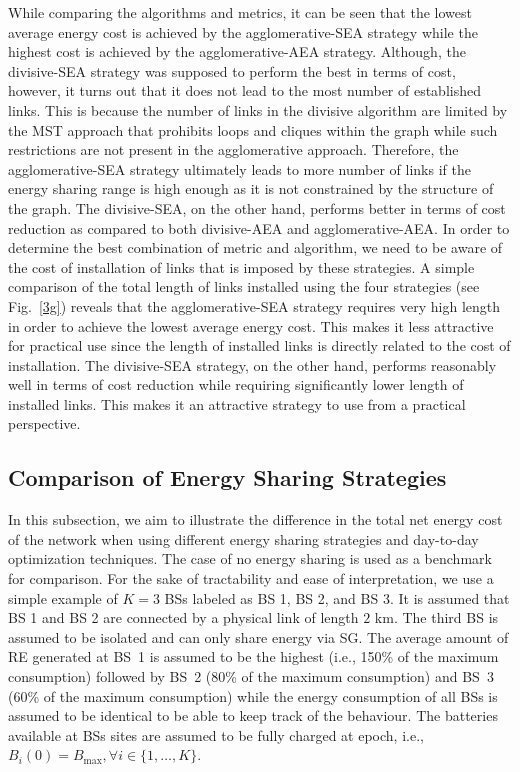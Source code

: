 \documentclass[10pt, letter,twocolumn]{IEEEtran}
\begin{document}
While comparing the algorithms and metrics, it can be seen that the lowest average energy cost is achieved by the agglomerative-SEA strategy while the highest cost is achieved by the agglomerative-AEA strategy. Although, the divisive-SEA strategy was supposed to perform the best in terms of cost, however, it turns out that it does not lead to the most number of established links. This is because the number of links in the divisive algorithm are limited by the MST approach that prohibits loops and cliques within the graph while such restrictions are not present in the agglomerative approach. Therefore, the agglomerative-SEA strategy ultimately leads to more number of links if the energy sharing range is high enough as it is not constrained by the structure of the graph. The divisive-SEA, on the other hand, performs better in terms of cost reduction as compared to both divisive-AEA and agglomerative-AEA. In order to determine the best combination of metric and algorithm, we need to be aware of the cost of installation of links that is imposed by these strategies. A simple comparison of the total length of links installed using the four strategies (see Fig.~\ref{3g}) reveals that the agglomerative-SEA strategy requires very high length in order to achieve the lowest average energy cost. This makes it less attractive for practical use since the length of installed links is directly related to the cost of installation. The divisive-SEA strategy, on the other hand, performs reasonably well in terms of cost reduction while requiring significantly lower length of installed links. This makes it an attractive strategy to use from a practical perspective.

\vspace{-0.0cm}
\subsection{Comparison of Energy Sharing Strategies} \label{cost_comparison}\vspace{-0.0cm}
In this subsection, we aim to illustrate the difference in the total net energy cost of the network when using different energy sharing strategies and day-to-day optimization techniques. The case of no energy sharing is used as a benchmark for comparison. For the sake of tractability and ease of interpretation, we use a simple example of $K = 3$ BSs labeled as BS 1, BS 2, and BS 3. It is assumed that BS 1 and BS 2 are connected by a physical link of length $2$ km. The third BS is assumed to be isolated and can only share energy via SG. The average amount of RE generated at BS~1 is assumed to be the highest (i.e., 150\% of the maximum consumption) followed by BS~2 (80\% of the maximum consumption) and BS~3 (60\% of the maximum consumption) while the energy consumption of all BSs is assumed to be identical to be able to keep track of the behaviour. The batteries available at BSs sites are assumed to be fully charged at epoch, i.e., $B_{i}(0) = B_{\max}, \forall i \in \{1,\ldots,K\}$.
\end{document}
